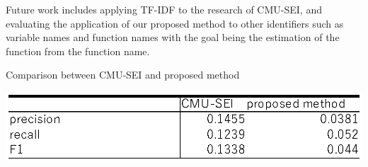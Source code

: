 \documentclass[JIP]{apris}
\begin{document}
Future work includes applying TF-IDF to the research of CMU-SEI, and evaluating the application of our proposed method to other identifiers such as variable names and function names with the goal being the estimation of the function from the function name.

\begin{table}[t]
 \centering
 \caption{Comparison between CMU-SEI and proposed method}
 \includegraphics[width=1.0\hsize]{image/cmu-kyu.eps} 
 \label{table2} 
\end{table}






\end{document}
